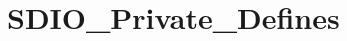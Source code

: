 \hypertarget{group___s_d_i_o___private___defines}{}\section{S\+D\+I\+O\+\_\+\+Private\+\_\+\+Defines}
\label{group___s_d_i_o___private___defines}
